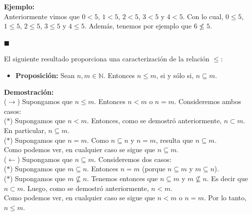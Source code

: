 \documentclass[10 pt]{article}
\begin{document}
\Large{\textbf{Ejemplo:}} \\

\Large{Anteriormente vimos que $0<5$, $1<5$, $2<5$, $3<5$ y $4<5$. Con lo cual, $0 \leq 5$, $1 \leq 5$, $2 \leq 5$, $3 \leq 5$ y $4 \leq 5$. Además, tenemos por ejemplo que $6 \nleq 5$.} \\

\begin{flushright}
    $\blacksquare$
\end{flushright}

\Large{El siguiente resultado proporciona una caracterización de la relación $\leq$:} \\

\begin{itemize}
    \item \Large{\textbf{Proposición:} Sean $n,m \in \mathbb N$. Entonces $n \leq m$, si y sólo si, $n \subseteq m$.} \\
\end{itemize}

\Large{\textbf{Demostración:} \\

($\rightarrow$) Supongamos que $n \leq m$. Entonces $n<m$ o $n=m$. Consideremos ambos casos: \\

($\ast$) Supongamos que $n<m$. Entonces, como se demostró anteriormente, $n \subset m$. En particular, $n \subseteq m$. \\

($\ast$) Supongamos que $n=m$. Como $n \subseteq n$ y $n=m$, resulta que $n \subseteq m$. \\

Como podemos ver, en cualquier caso se sigue que $n \subseteq m$. \\

($\leftarrow$) Supongamos que $n \subseteq m$. Consideremos dos casos: \\

($\ast$) Supongamos que $m \subseteq n$. Entonces $n=m$ (porque $n \subseteq m$ y $m \subseteq n$). \\

($\ast$) Supongamos que $m \nsubseteq n$. Tenemos entonces que $n \subseteq m$ y $m \nsubseteq n$. Es decir que $n \subset m$. Luego, como se demostró anteriormente, $n<m$. \\

Como podemos ver, en cualquier caso se sigue que $n<m$ o $n=m$. Por lo tanto, $n \leq m$.} \\
\end{document}
